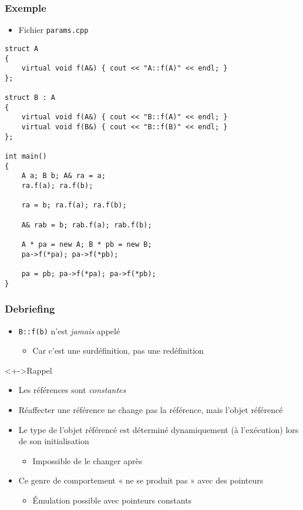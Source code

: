 \begin{frame}[containsverbatim]
\frametitle{Exemple}
\begin{itemize}
\item Fichier \texttt{params.cpp}
\end{itemize}
\begin{lstlisting}
struct A
{
	virtual void f(A&) { cout << "A::f(A)" << endl; }
};

struct B : A
{
	virtual void f(A&) { cout << "B::f(A)" << endl; }
	virtual void f(B&) { cout << "B::f(B)" << endl; }
};

int main()
{
	A a; B b; A& ra = a;
	ra.f(a); ra.f(b);
	
	ra = b; ra.f(a); ra.f(b);
	
	A& rab = b; rab.f(a); rab.f(b);
	
	A * pa = new A; B * pb = new B;
	pa->f(*pa); pa->f(*pb);
	
	pa = pb; pa->f(*pa); pa->f(*pb);
}
\end{lstlisting}
\end{frame}

\begin{frame}
\frametitle{Debriefing}
\begin{itemize}[<+->]
\item \texttt{B::f(b)} n'est \emph{jamais} appelé
	\begin{itemize}
	\item Car c'est une surdéfinition, pas une redéfinition
	\end{itemize}
\end{itemize}
\begin{exampleblock}<+->{Rappel}
	\begin{itemize}[<+->]
	\item Les références sont \emph{constantes}
	\end{itemize}
\end{exampleblock}
\begin{itemize}[<+->]
\item Réaffecter une référence ne change pas la référence, mais l'objet référencé
\item Le type de l'objet référencé est déterminé dynamiquement (à l'exécution) lors de son initialisation
	\begin{itemize}
	\item Impossible de le changer après
	\end{itemize}
\item Ce genre de comportement « ne se produit pas » avec des pointeurs
	\begin{itemize}
	\item Émulation possible avec pointeurs constants
	\end{itemize}
\end{itemize}
\end{frame}

